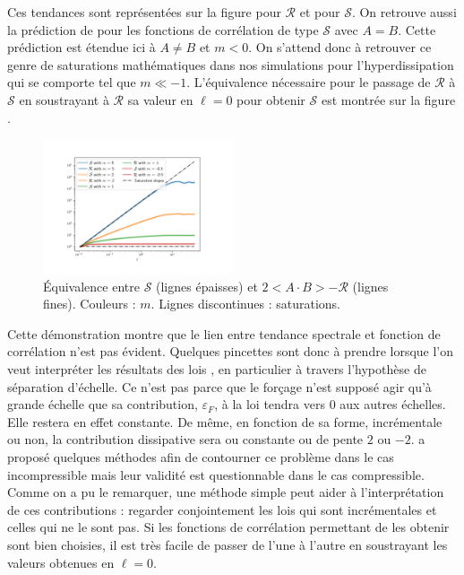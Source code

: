  Ces tendances sont représentées sur la figure  pour $\mathcal{R}$ et  pour $\mathcal{S}$. On retrouve aussi la prédiction de \cite{cho_simulations_2009} pour les fonctions de corrélation de type $\mathcal{S}$ avec $A=B$. Cette prédiction est étendue ici à $A\neq B$ et $m<0$.  On s'attend donc à retrouver ce genre de saturations mathématiques dans nos simulations pour l'hyperdissipation qui se comporte tel que $m \ll -1$. L'équivalence nécessaire pour le passage de $\mathcal{R}$ à $\mathcal{S}$ en soustrayant à $\mathcal{R}$ sa valeur en $\ell = 0$ pour obtenir $\mathcal{S}$ est montrée sur la figure .


  \begin{figure}
  \center
 \includegraphics[width=0.5\textwidth,trim = 2cm 0.5cm 2cm 2cm, clip]{./Mainmatter/Part_Appendix/images/sat_comp_2}
 \cprotect\caption{Équivalence entre \ensuremath{\mathcal{S}} (lignes épaisses) et \ensuremath{2<A\cdot B> - \mathcal{R}} (lignes fines). Couleurs : \ensuremath{m}. Lignes discontinues : saturations. }
 \label{fig:sat_comp}
 \end{figure}
  
 Cette démonstration montre que le lien entre tendance spectrale et fonction de corrélation n'est pas évident. Quelques pincettes sont donc à prendre lorsque l'on veut interpréter les résultats des lois , en particulier à travers l'hypothèse de séparation d'échelle. Ce n'est pas parce que le forçage n'est supposé agir qu'à grande échelle que sa contribution, $\varepsilon_F$, à la loi  tendra vers 0 aux autres échelles. Elle restera en effet constante. De même, en fonction de sa forme, incrémentale ou non, la contribution dissipative sera ou constante ou de pente $2$ ou $-2$. \cite{ferrand_multi-scale_2021} a proposé quelques méthodes afin de contourner ce problème dans le cas incompressible mais leur validité est questionnable dans le cas compressible. Comme on a pu le remarquer, une méthode simple peut aider à l'interprétation de ces contributions : regarder conjointement les lois  qui sont incrémentales et celles qui ne le sont pas. Si les fonctions de corrélation permettant de les obtenir sont bien choisies, il est très facile de passer de l'une à l'autre en soustrayant les valeurs obtenues en $\ell=0$. 
